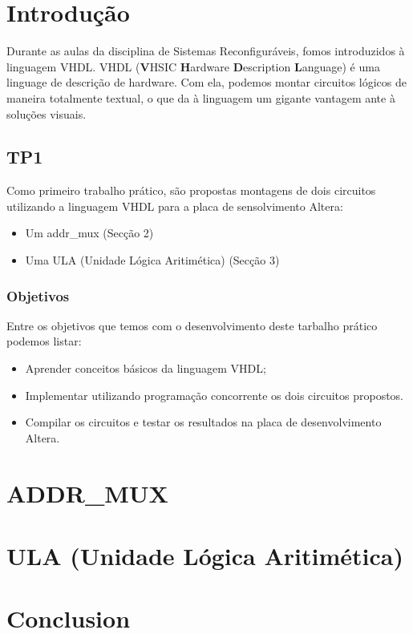 \documentclass{article}
\begin{document}


\newpage
\thispagestyle{empty}
\tableofcontents
\newpage

\large

\section{Introdução}
Durante as aulas da disciplina de Sistemas Reconfiguráveis, fomos introduzidos à linguagem VHDL. VHDL (\textbf{V}HSIC \textbf{H}ardware \textbf{D}escription \textbf{L}anguage) é uma linguage de descrição de hardware. Com ela, podemos montar circuitos lógicos de maneira totalmente textual, o que da à linguagem um gigante vantagem ante à soluções visuais.

\subsection{TP1}
Como primeiro trabalho prático, são propostas montagens de dois circuitos utilizando a linguagem VHDL para a placa de sensolvimento Altera:

\begin{itemize}
    \item Um addr\_mux (Secção 2)
    \item Uma ULA (Unidade Lógica Aritimética) (Secção 3)
\end{itemize}

\subsubsection{Objetivos}

Entre os objetivos que temos com o desenvolvimento deste tarbalho prático podemos listar:

\begin{itemize}
    \item Aprender conceitos básicos da linguagem VHDL;
    \item Implementar utilizando programação concorrente os dois circuitos propostos.
    \item Compilar os circuitos e testar os resultados na placa de desenvolvimento Altera.
\end{itemize}

\section{ADDR\_MUX}
\lipsum[1]

\section{ULA (Unidade Lógica Aritimética)}
\lipsum[3]

\section{Conclusion}
\lipsum[4]
\end{document}
